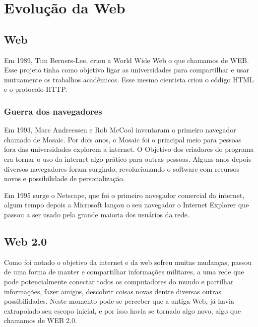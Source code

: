 \documentclass[
	12pt,				%
	openright,			%
	twoside,			%
	a4paper,			%
	Times,
	brazil,				%
	]{abntex2}
\begin{document}
\chapter{Evolução da Web}

\section{Web}

Em 1989, Tim Berners-Lee, criou a World Wide Web o que chamamos de WEB. Esse projeto tinha como objetivo ligar as universidades para compartilhar e usar mutuamente os trabalhos acadêmicos. Esse mesmo cientista criou o código HTML e o protocolo HTTP.  \cite{web}
\par

\subsection{Guerra dos navegadores}
Em 1993, Marc Andreessen e Rob McCool inventaram o primeiro navegador chamado de Mosaic. Por dois anos, o Mosaic foi o principal meio para pessoas fora das universidades explorem a internet. O Objetivo dos criadores do programa era tornar o uso da internet algo prático para outras pessoas. Alguns anos depois  diversos navegadores foram surgindo, revolucionando o software com recursos novos e possibilidade de personalização. \cite{web}
\par

Em 1995 surge o Netscape, que foi o primeiro navegador comercial da internet, algum tempo depois a Microsoft lançou o seu navegador o Internet Explorer que passou a ser usado pela grande maioria dos usuários da rede. \cite{web}
\par

\section{Web 2.0}

Como foi notado o objetivo da internet e da web sofreu muitas mudanças, passou de uma forma de manter e compartilhar informações militares, a uma rede que pode potencialmente conectar todos os computadores do mundo e partilhar informações, fazer amigos, descobrir coisas novas dentre diversas outras possibilidades. Neste momento pode-se perceber que a antiga Web, já havia extrapolado seu escopo inicial, e por isso havia se tornado algo novo, algo que chamamos de WEB 2.0. \cite{ARPANET, historia-internt, web, web2.0}
\par
\end{document}
